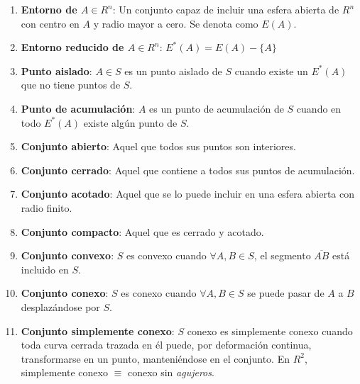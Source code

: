 \documentclass[twoside]{article}
\numberwithin{equation}{section}
\numberwithin{figure}{section}
\numberwithin{table}{section}
\begin{document}
				\begin{enumerate}
					\item \textbf{Entorno de $A\in R^n$}: Un conjunto capaz de incluir una esfera abierta de $R^n$ con centro en $A$ y radio mayor a cero. Se denota como $E(A)$.
					\item \textbf{Entorno reducido de $A\in R^n$}: $E^*(A)=E(A)-\{A\}$
					\item \textbf{Punto aislado}: $A\in S$ es un punto aislado de $S$ cuando existe un $E^*(A)$ que no tiene puntos de $S$.
					\item \textbf{Punto de acumulación}: $A$ es un punto de acumulación de $S$ cuando en todo $E^*(A)$ existe algún punto de $S$.
					\item \textbf{Conjunto abierto}: Aquel que todos sus puntos son interiores.
					\item \textbf{Conjunto cerrado}: Aquel que contiene a todos sus puntos de acumulación.
					\item \textbf{Conjunto acotado}: Aquel que se lo puede incluir en una esfera abierta con radio finito.
					\item \textbf{Conjunto compacto}: Aquel que es cerrado y acotado.
					\item \textbf{Conjunto convexo}: $S$ es convexo cuando $\forall A,B\in S$, el segmento $\overline{AB}$ está incluido en $S$.
					\item \textbf{Conjunto conexo}: $S$ es conexo cuando $\forall A,B\in S$ se puede pasar de $A$ a $B$ desplazándose por $S$.
					\item \textbf{Conjunto simplemente conexo}: $S$ conexo es simplemente conexo cuando toda curva cerrada trazada en él puede, por deformación continua, transformarse en un punto, manteniéndose en el conjunto. En $R^2$, simplemente conexo $\equiv$ conexo sin \emph{agujeros}.
				\end{enumerate}
	
				\begin{figure}[H]
					 \hfill{}
					 \hfill{}
				\end{figure}			
		
\end{document}
